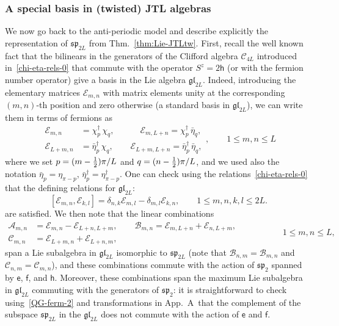 \documentclass[11pt]{article}
\newcommand{\ffrac}[2]{\mbox{\footnotesize$\displaystyle\frac{#1}{#2}$}}
\newcommand{\f}{\mathsf{f}}
\newcommand{\h}{\mathsf{h}}
\newcommand{\e}{\mathsf{e}}
\newcommand{\half}{%
  \mathchoice{\ffrac{1}{2}}{\frac{1}{2}}{\frac{1}{2}}{\frac{1}{2}}}
\newcommand{\chid}{\chi^{\dagger}}
\newcommand{\etad}{\eta^{\dagger}}
\newcommand{\bbeta}{\bar{\eta}}
\newcommand{\bbetad}{\bar{\eta}^{\dagger}}
\newcommand{\Clif}[1]{\mathscr{C}_{#1}}
\newcommand{\Asp}{\mathcal{A}}
\newcommand{\Bsp}{\mathcal{B}}
\newcommand{\Csp}{\mathcal{C}}
\newcommand{\Egl}{\mathcal{E}}
\newcommand{\gl}{\mathfrak{gl}}
\newcommand{\ssp}{\mathfrak{sp}}
\newcommand{\Appfourier}{A~}
\theoremstyle{definition}
\begin{document}
\subsubsection{A special basis in (twisted) JTL algebras}
We now go back to the anti-periodic model and describe explicitly the representation of $\ssp_{2L}$ from Thm.~\ref{thm:Lie-JTLtw}.
First, recall the well known fact  that the bilinears in  the generators of the Clifford algebra $\Clif{4L}$ introduced in~\eqref{chi-eta-rels-0}  that commute with the operator $S^z=2\h$ (or with the fermion number operator)  give a basis in the Lie algebra
$\gl_{2L}$. Indeed, introducing the elementary matrices $\Egl_{m,n}$ with matrix elements unity  at the corresponding $(m,n)$-th position and zero otherwise (a standard basis
in $\gl_{2L}$), we can write them in terms of  fermions as
\begin{equation}\label{gl-stand-basis}
\begin{split}
\Egl_{m,n} &= \chid_p\,\chi_q,\qquad\quad\Egl_{m,L+n} = \chid_p\,\bbeta_q,\\
\Egl_{L+m,n} &= \bbetad_p\,\chi_q,\qquad\Egl_{L+m,L+n} =
\bbetad_p\,\bbeta_q,
\end{split}, \qquad 1\leq m,n\leq L
\end{equation}
where we set  $p=(m-\half)\pi/L$ and
$q=(n-\half)\pi/L$,
 and we used also the notation $\bbeta_p=\eta_{\pi-p}$,
$\bbetad_p=\etad_{\pi-p}$. One can  check using the
relations~\eqref{chi-eta-rels-0} that the defining relations
for $\gl_{2L}$:
\begin{equation}\label{rel-gln-stand}
[\Egl_{m,n},\Egl_{k,l}] = \delta_{n,k}\Egl_{m,l} - \delta_{m,l}\Egl_{k,n}, \qquad  1\leq m,n,k,l\leq2L.
\end{equation}
 are satisfied. We then note that the linear combinations
\begin{equation}\label{sp-stand-basis}
\begin{split}
\Asp_{m,n} &= \Egl_{m,n} - \Egl_{L+n,L+m} ,\qquad\Bsp_{m,n} =
\Egl_{m,L+n} + \Egl_{n,L+m},\\
\Csp_{m,n} &= \Egl_{L+m,n} + \Egl_{L+n,m},
\end{split}\qquad\qquad\quad 1\leq m,n\leq L,
\end{equation}
span a Lie subalgebra in $\gl_{2L}$ isomorphic to $\ssp_{2L}$ (note that $\Bsp_{n,m} = \Bsp_{m,n}$ and $\Csp_{n,m} = \Csp_{m,n}$), and
these combinations commute with the action of $\ssp_{2}$ spanned by $\e$, $\f$, and $\h$.
Moreover, these combinations span the maximum Lie subalgebra in $\gl_{2L}$ commuting with the generators of $\ssp_{2}$: it is straightforward to check using~\eqref{QG-ferm-2} and transformations in App.~\Appfourier that the complement of the subspace $\ssp_{2L}$ in the $\gl_{2L}$ does not commute with the action of $\e$ and $\f$.
\end{document}
